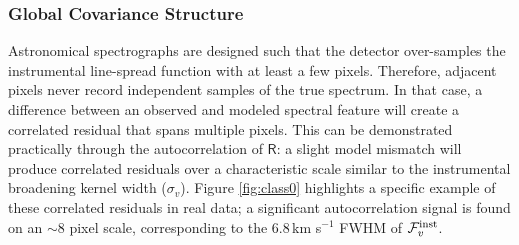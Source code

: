 \documentclass[iop,floatfix,numberedappendix,twocolappendix]{emulateapj}
\newcommand{\vR}{\mathsf{R}}
\begin{document}
\subsubsection{Global Covariance Structure} \label{subsec:global_covariance}

Astronomical spectrographs are designed such that the detector over-samples the instrumental 
line-spread function with at least a few pixels.  Therefore, adjacent pixels never record 
independent samples of the true spectrum.  In that case, a difference between an observed and 
modeled spectral feature will create a correlated residual that spans multiple pixels.  This can be 
demonstrated practically through the autocorrelation of $\vR$: a slight model mismatch will produce 
correlated residuals over a characteristic scale similar to the instrumental broadening kernel 
width ($\sigma_v$).  Figure \ref{fig:class0} highlights a specific example of these correlated 
residuals in real data; a significant autocorrelation signal is found on an $\sim$8 pixel scale, 
corresponding to the 6.8\,km s$^{-1}$ FWHM of $\mathcal{F}_v^{\rm inst}$.  
\end{document}
